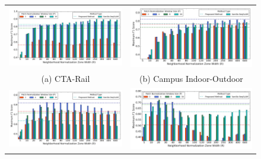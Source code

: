 \documentclass[letterpaper, 10 pt, conference]{ieeeconf}  %
\begin{document}
\begin{figure}
\centering
 \begin{tabular*}{\textwidth}[t]{cc}
\includegraphics[scale=0.26]{RPerformanceBar_cta-rail} &
\includegraphics[scale=0.26]{RPerformanceBar_indoor-outdoor}\\
(a) CTA-Rail & (b) Campus Indoor-Outdoor \\
\includegraphics[scale=0.26]{RPerformanceBar_parking_amrapali} &
\includegraphics[scale=0.26]{RPerformanceBar_home-indoor-outdoor} \\

\end{tabular*}
\end{figure}
\end{document}
